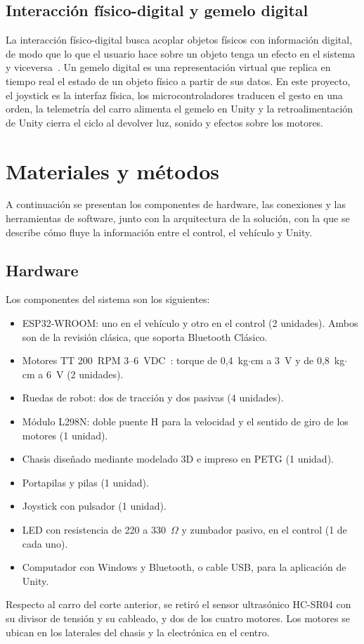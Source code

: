 \documentclass[journal]{IEEEtran}
\begin{document}
\subsection{Interacción físico-digital y gemelo digital}
La interacción físico-digital busca acoplar objetos físicos con información digital, de modo que lo que el usuario hace sobre un objeto tenga un efecto en el sistema y viceversa~\cite{ishii}. Un gemelo digital es una representación virtual que replica en tiempo real el estado de un objeto físico a partir de sus datos. En este proyecto, el joystick es la interfaz física, los microcontroladores traducen el gesto en una orden, la telemetría del carro alimenta el gemelo en Unity y la retroalimentación de Unity cierra el ciclo al devolver luz, sonido y efectos sobre los motores.

\section{Materiales y métodos}
A continuación se presentan los componentes de hardware, las conexiones y las herramientas de software, junto con la arquitectura de la solución, con la que se describe cómo fluye la información entre el control, el vehículo y Unity.

\subsection{Hardware}
Los componentes del sistema son los siguientes:
\begin{itemize}
\item ESP32-WROOM: uno en el vehículo y otro en el control (2 unidades). Ambos son de la revisión clásica, que soporta Bluetooth Clásico.
\item Motores TT 200~RPM 3--6~VDC~\cite{tt}: torque de 0,4~kg$\cdot$cm a 3~V y de 0,8~kg$\cdot$cm a 6~V (2 unidades).
\item Ruedas de robot: dos de tracción y dos pasivas (4 unidades).
\item Módulo L298N: doble puente H para la velocidad y el sentido de giro de los motores (1 unidad).
\item Chasis diseñado mediante modelado 3D e impreso en PETG (1 unidad).
\item Portapilas y pilas (1 unidad).
\item Joystick con pulsador (1 unidad).
\item LED con resistencia de 220 a 330~$\Omega$ y zumbador pasivo, en el control (1 de cada uno).
\item Computador con Windows y Bluetooth, o cable USB, para la aplicación de Unity.
\end{itemize}
Respecto al carro del corte anterior, se retiró el sensor ultrasónico HC-SR04 con su divisor de tensión y su cableado, y dos de los cuatro motores. Los motores se ubican en los laterales del chasis y la electrónica en el centro.
\end{document}
